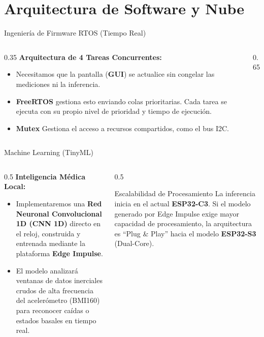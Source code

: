 \documentclass[aspectratio=169, 10pt]{beamer}
\begin{document}
\section{Arquitectura de Software y Nube}

\begin{frame}{Ingeniería de Firmware RTOS (Tiempo Real)}
    \begin{columns}[c]
        \begin{column}{0.35\textwidth}
            \textbf{Arquitectura de 4 Tareas Concurrentes:}
            \begin{itemize}
                \item Necesitamos que la pantalla (\textbf{GUI}) se actualice sin congelar las mediciones ni la inferencia. 
                \item \textbf{FreeRTOS} gestiona esto enviando colas prioritarias. Cada tarea se ejecuta con su propio nivel de prioridad y tiempo de ejecución.
                \item \textbf{Mutex} Gestiona el acceso a recursos compartidos, como el bus I2C.
            \end{itemize}
        \end{column}
        \begin{column}{0.65\textwidth}
            \resizebox{\linewidth}{!}{}
        \end{column}
    \end{columns}
\end{frame}

\begin{frame}{Machine Learning (TinyML)}
    \begin{columns}[c]
        \begin{column}{0.5\textwidth}
            \textbf{Inteligencia Médica Local:}
            \begin{itemize}
                \item Implementaremos una \textbf{Red Neuronal Convolucional 1D (CNN 1D)} directo en el reloj, construida y entrenada mediante la plataforma \textbf{Edge Impulse}.
                \item El modelo analizará ventanas de datos inerciales crudos de alta frecuencia del acelerómetro (BMI160) para reconocer caídas o estados basales en tiempo real.
            \end{itemize}
        \end{column}
        \begin{column}{0.5\textwidth}
            \begin{block}{Escalabilidad de Procesamiento}
                La inferencia inicia en el actual \textbf{ESP32-C3}. Si el modelo generado por Edge Impulse exige mayor capacidad de procesamiento, la arquitectura es ``Plug \& Play'' hacia el modelo \textbf{ESP32-S3} (Dual-Core).
            \end{block}
        \end{column}
    \end{columns}
\end{frame}
\end{document}
